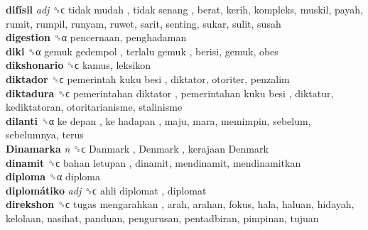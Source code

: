 \textbf{difísil} \emph{adj}  ␝ϲ   tidak mudah ,  tidak senang , berat, kerih, kompleks, muskil, payah, rumit, rumpil, runyam, ruwet, sarit, senting, sukar, sulit, susah  \\
\textbf{digestion} ␝α  pencernaan, penghadaman  \\
\textbf{diki} ␝α   gemuk gedempol ,  terlalu gemuk , berisi, gemuk, obes  \\
\textbf{dikshonario} ␝ϲ  kamus, leksikon  \\
\textbf{diktador} ␝ϲ   pemerintah kuku besi , diktator, otoriter, penzalim  \\
\textbf{diktadura} ␝ϲ   pemerintahan diktator ,  pemerintahan kuku besi , diktatur, kediktatoran, otoritarianisme, stalinisme  \\
\textbf{dilanti} ␝α   ke depan ,  ke hadapan , maju, mara, memimpin, sebelum, sebelumnya, terus  \\
\textbf{Dinamarka} \emph{n}  ␝ϲ   Danmark ,  Denmark ,  kerajaan Denmark   \\
\textbf{dinamit} ␝ϲ   bahan letupan , dinamit, mendinamit, mendinamitkan  \\
\textbf{diploma} ␝α  diploma  \\
\textbf{diplomátiko} \emph{adj}  ␝ϲ   ahli diplomat , diplomat  \\
\textbf{direkshon} ␝ϲ   tugas mengarahkan , arah, arahan, fokus, hala, haluan, hidayah, kelolaan, nasihat, panduan, pengurusan, pentadbiran, pimpinan, tujuan  \\
